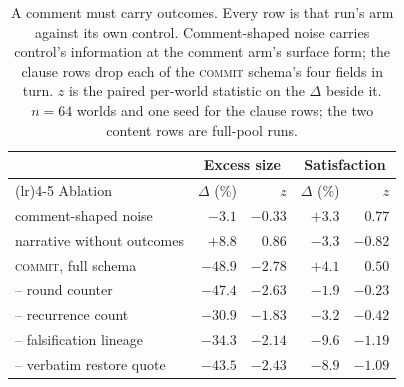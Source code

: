 \begin{table}[t]
  \centering\small
  \begin{tabularx}{\textwidth}{@{}>{\raggedright\arraybackslash}Xrrrr@{}}
    \toprule
    & \multicolumn{2}{c}{Excess size} & \multicolumn{2}{c}{Satisfaction} \\
    \cmidrule(lr){2-3} \cmidrule(lr){4-5}
    Ablation & $\Delta$ (\%) & $z$ & $\Delta$ (\%) & $z$ \\
    \midrule
    comment-shaped noise & $-3.1$ & $-0.33$ & $+3.3$ & $0.77$ \\
    narrative without outcomes & $+8.8$ & $0.86$ & $-3.3$ & $-0.82$ \\
    \textsc{commit}, full schema & $-48.9$ & $-2.78$ & $+4.1$ & $0.50$ \\
    \quad -- round counter & $-47.4$ & $-2.63$ & $-1.9$ & $-0.23$ \\
    \quad -- recurrence count & $-30.9$ & $-1.83$ & $-3.2$ & $-0.42$ \\
    \quad -- falsification lineage & $-34.3$ & $-2.14$ & $-9.6$ & $-1.19$ \\
    \quad -- verbatim restore quote & $-43.5$ & $-2.43$ & $-8.9$ & $-1.09$ \\
    \bottomrule
  \end{tabularx}
  \caption{
    A comment must carry outcomes. Every row is that run's arm against its own control.
    Comment-shaped noise carries control's information at the comment arm's surface form; the
    clause rows drop each of the \textsc{commit} schema's four fields in turn. $z$ is the paired
    per-world statistic on the $\Delta$ beside it. $n{=}64$ worlds and one seed for the clause
    rows; the two content rows are full-pool runs.
  }
  \label{tab:ablations}
\end{table}
